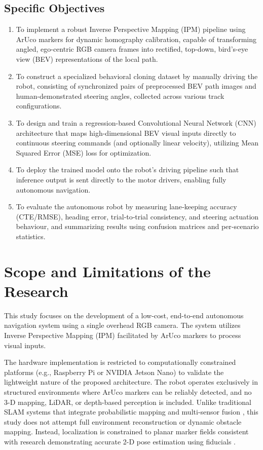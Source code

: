 \subsection{Specific Objectives}
\begin{enumerate}
    \item To implement a robust Inverse Perspective Mapping (IPM) pipeline using ArUco markers for dynamic homography calibration, capable of transforming angled, ego-centric RGB camera frames into rectified, top-down, bird’s-eye view (BEV) representations of the local path.
    \item To construct a specialized behavioral cloning dataset by manually driving the robot, consisting of synchronized pairs of preprocessed BEV path images and human-demonstrated steering angles, collected across various track configurations.
    \item To design and train a regression-based Convolutional Neural Network (CNN) architecture that maps high-dimensional BEV visual inputs directly to continuous steering commands (and optionally linear velocity), utilizing Mean Squared Error (MSE) loss for optimization.
    \item To deploy the trained model onto the robot's driving pipeline such that inference output is sent directly to the motor drivers, enabling fully autonomous navigation.
    \item To evaluate the autonomous robot by measuring lane‑keeping accuracy (CTE/RMSE), heading error, trial‑to‑trial consistency, and steering actuation behaviour, and summarizing results using confusion matrices and per‑scenario statistics.
\end{enumerate}


\section{Scope and Limitations of the Research}
This study focuses on the development of a low-cost, end-to-end autonomous navigation system using a single overhead RGB camera. The system utilizes Inverse Perspective Mapping (IPM) facilitated by ArUco markers to process visual inputs.

The hardware implementation is restricted to computationally constrained platforms (e.g., Raspberry Pi or NVIDIA Jetson Nano) to validate the lightweight nature of the proposed architecture. The robot operates exclusively in structured environments where ArUco markers can be reliably detected, and no 3-D mapping, LiDAR, or depth-based perception is included. Unlike traditional SLAM systems that integrate probabilistic mapping and multi-sensor fusion \cite{Cadena2016SLAMRobustPerception, Cieslewski2017DecentralizedVisualSLAM}, this study does not attempt full environment reconstruction or dynamic obstacle mapping. Instead, localization is constrained to planar marker fields consistent with research demonstrating accurate 2-D pose estimation using fiducials \cite{GarridoJurado2014FiducialMarkers, RomeroRamirez2018SpeededFiducialDetection}.

